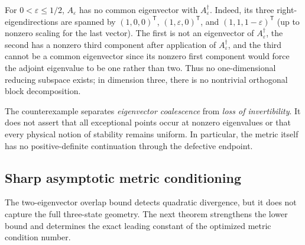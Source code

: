 \begin{remark}
\label{rem:coupled}
For $0<\varepsilon\leq1/2$, $A_\varepsilon$ has no common
eigenvector with $A_\varepsilon^\dagger$. Indeed, its three
right-eigendirections are spanned by
$(1,0,0)^\mathsf{T}$, $(1,\varepsilon,0)^\mathsf{T}$,
and $(1,1,1-\varepsilon)^\mathsf{T}$
(up to nonzero scaling for the last vector).
The first is not an eigenvector of $A_\varepsilon^\dagger$,
the second has a nonzero third component after application of
$A_\varepsilon^\dagger$, and the third cannot be a common
eigenvector since its nonzero first component would force the
adjoint eigenvalue to be one rather than two.
Thus no one-dimensional reducing subspace exists; in dimension three,
there is no nontrivial orthogonal block decomposition.
\end{remark}

The counterexample separates \emph{eigenvector coalescence} from
\emph{loss of invertibility}. It does not assert that all exceptional
points occur at nonzero eigenvalues or that every physical notion of
stability remains uniform. In particular, the metric itself has no
positive-definite continuation through the defective endpoint.

\subsection{Sharp asymptotic metric conditioning}
The two-eigenvector overlap bound detects quadratic divergence, but it does not
capture the full three-state geometry.  The next theorem strengthens the lower
bound and determines the exact leading constant of the optimized metric
condition number.
